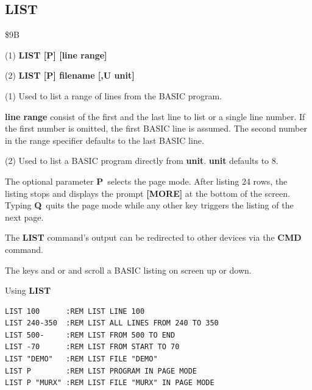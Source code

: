 
\newpage
\subsection{LIST}
\begin{description}[leftmargin=2cm,style=nextline]
\item [Token:] \$9B
\item [Format:] (1) {\bf LIST [P] [line range]}

(2) {\bf LIST [P] filename [,U unit]}

\item [Usage:] (1) Used to list a range of lines from the BASIC program.

               {\bf line range} consist of the first and the last
               line to list or a single line number.
               If the first number is omitted, the
               first BASIC line is assumed.
               The second number in the range specifier defaults
               to the last BASIC line.

               (2) Used to list a BASIC program directly from {\bf unit}.
               {\bf unit} defaults to 8.

               The optional parameter {\bf P} selects the page mode.
               After listing 24 rows, the listing stops and displays
               the prompt {\bf [MORE]} at the bottom of the screen.
               Typing {\bf Q} quits the page mode while any other key
               triggers the listing of the next page.

\item [Remarks:] The {\bf LIST} command's output can be redirected
                 to other devices via the {\bf CMD} command.

                The keys  and  or
                   and
                  
                scroll a BASIC listing on screen up or down.

\item [Example:] Using {\bf LIST}
\begin{tcolorbox}[colback=black,coltext=white]
\verbatimfont{\codefont}
\begin{verbatim}
LIST 100      :REM LIST LINE 100
LIST 240-350  :REM LIST ALL LINES FROM 240 TO 350
LIST 500-     :REM LIST FROM 500 TO END
LIST -70      :REM LIST FROM START TO 70
LIST "DEMO"   :REM LIST FILE "DEMO"
LIST P        :REM LIST PROGRAM IN PAGE MODE
LIST P "MURX" :REM LIST FILE "MURX" IN PAGE MODE
\end{verbatim}
\end{tcolorbox}
\end{description}

